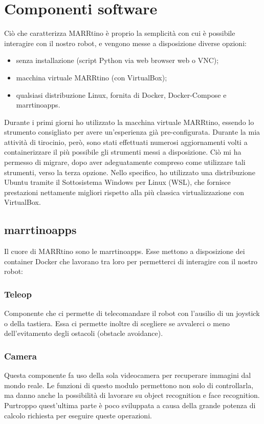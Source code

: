\documentclass[italian, twoside]{sapthesis} %
\begin{document}
\section{Componenti software}
Ciò che caratterizza MARRtino è proprio la semplicità con cui è possibile interagire con il nostro robot, e vengono messe a disposizione diverse opzioni:

\begin{itemize}
	\item senza installazione (script Python via web browser web o VNC);
	\item macchina virtuale MARRtino (con VirtualBox);
	\item qualsiasi distribuzione Linux, fornita di Docker, Docker-Compose e marrtinoapps.
\end{itemize}

Durante i primi giorni ho utilizzato la macchina virtuale MARRtino, essendo lo strumento consigliato per avere un'esperienza già pre-configurata. Durante la mia attività di tirocinio, però, sono stati effettuati numerosi aggiornamenti volti a containerizzare il più possibile gli strumenti messi a disposizione. Ciò mi ha permesso di migrare, dopo aver adeguatamente compreso come utilizzare tali strumenti, verso la terza opzione. Nello specifico, ho utilizzato una distribuzione Ubuntu tramite il Sottosistema Windows per Linux (WSL), che fornisce prestazioni nettamente migliori rispetto alla più classica virtualizzazione con VirtualBox.

\subsection{marrtinoapps}
Il cuore di MARRtino sono le marrtinoapps. Esse mettono a disposizione dei container Docker che lavorano tra loro per permetterci di interagire con il nostro robot:
\subsubsection{Teleop}
Componente che ci permette di telecomandare il robot con l'ausilio di un joystick o della tastiera. Essa ci permette inoltre di scegliere se avvalerci o meno dell'evitamento degli ostacoli (obstacle avoidance).
\subsubsection{Camera}
Questa componente fa uso della sola videocamera per recuperare immagini dal
mondo reale. Le funzioni di questo modulo permettono non solo di controllarla,
ma danno anche la possibilità di lavorare su object recognition e face recognition.
Purtroppo quest'ultima parte è poco sviluppata a causa della grande potenza
di calcolo richiesta per eseguire queste operazioni.
\end{document}
